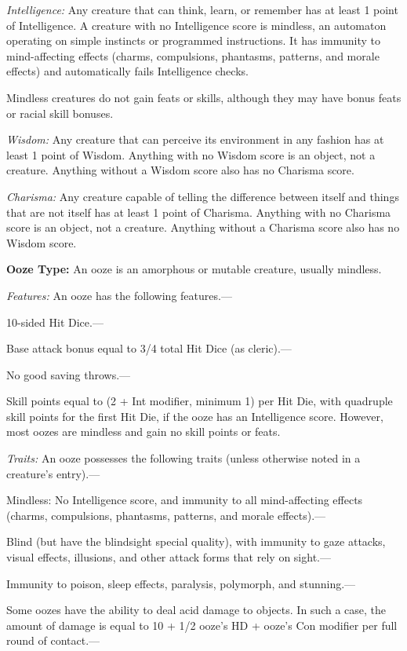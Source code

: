 \documentclass{article}
\begin{document}
\textit{Intelligence: }Any creature that can think, learn, or remember has at least 
1 point of Intelligence. A creature with no Intelligence score is mindless, an 
automaton operating on simple instincts or programmed instructions. It has immunity 
to mind-affecting effects (charms, compulsions, phantasms, patterns, and morale 
effects) and automatically fails Intelligence checks.

Mindless creatures do not gain feats or skills, although they may have bonus feats 
or racial skill bonuses.

\textit{Wisdom: }Any creature that can perceive its environment in any fashion 
has at least 1 point of Wisdom. Anything with no Wisdom score is an object, not 
a creature. Anything without a Wisdom score also has no Charisma score.

\textit{Charisma: }Any creature capable of telling the difference between itself 
and things that are not itself has at least 1 point of Charisma. Anything with 
no Charisma score is an object, not a creature. Anything without a Charisma score 
also has no Wisdom score.

\vspace{12pt}
\textbf{Ooze Type:} An ooze is an amorphous or mutable creature, usually mindless.

\textit{Features: }An ooze has the following features.---

10-sided Hit Dice.---

Base attack bonus equal to 3/4 total Hit Dice (as cleric).---

No good saving throws.---

Skill points equal to (2 + Int modifier, minimum 1) per Hit Die, with quadruple 
skill points for the first Hit Die, if the ooze has an Intelligence score. However, 
most oozes are mindless and gain no skill points or feats.

\textit{Traits: }An ooze possesses the following traits (unless otherwise noted 
in a creature's entry).---

Mindless: No Intelligence score, and immunity to all mind-affecting effects (charms, 
compulsions, phantasms, patterns, and morale effects).---

Blind (but have the blindsight special quality), with immunity to gaze attacks, 
visual effects, illusions, and other attack forms that rely on sight.---

Immunity to poison, sleep effects, paralysis, polymorph, and stunning.---

Some oozes have the ability to deal acid damage to objects. In such a case, the 
amount of damage is equal to 10 + 1/2 ooze's HD + ooze's Con modifier per full 
round of contact.---
\end{document}
